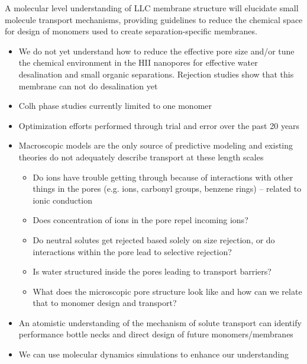 \documentclass{article}
\begin{document}
	A molecular level understanding of LLC membrane structure will elucidate small molecule transport mechanisms, providing guidelines to reduce the chemical space for design of monomers used to create separation-specific membranes.
	\begin{itemize}
                \item We do not yet understand how to reduce the effective pore size and/or tune the chemical environment in the HII nanopores for effective water desalination and small organic separations. Rejection studies show that this membrane can not do desalination yet
		\item Colh phase studies currently limited to one monomer
                \item Optimization efforts performed through trial and error over the past 20 years
                \item Macroscopic models are the only source of predictive modeling and existing theories do not adequately describe transport at these length scales
                \begin{itemize}
                        \item Do ions have trouble getting through because of interactions with other things in the pores (e.g. ions, carbonyl groups, benzene rings) -- related to ionic conduction
                        \item Does concentration of ions in the pore repel incoming ions?
                        \item Do neutral solutes get rejected based solely on size rejection, or do interactions within the pore lead to selective rejection?
                        \item Is water structured inside the pores leading to transport barriers?
			\item What does the microscopic pore structure look like and how can we relate that to monomer design and transport?
		\end{itemize}
		\item An atomistic understanding of the mechanism of solute transport can identify performance bottle necks and direct design of future monomers/membranes
		\item We can use molecular dynamics simulations to enhance our understanding 
	\end{itemize}
	 
\end{document}
